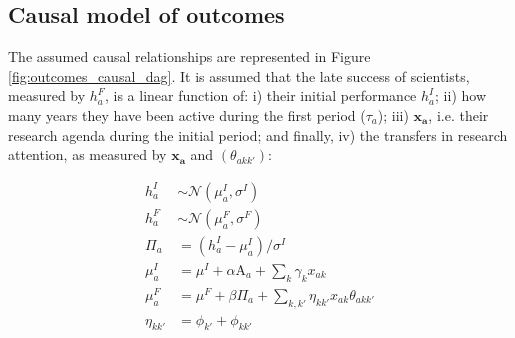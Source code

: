 \documentclass{article}
\begin{document}
\subsection{\label{appendix:outcomes}Causal model of outcomes}

The assumed causal relationships are represented in Figure \ref{fig:outcomes_causal_dag}. It is assumed that the late success of scientists, measured by $h_a^{F}$, is a linear function of: i) their initial performance $h_a^{I}$; ii) how many years they have been active during the first period ($\tau_a$); iii) $\bm{x_a}$, i.e. their research agenda during the initial period; and finally, iv) the transfers in research attention, as measured by $\bm{x_a}$ and $(\theta_{akk'})$:

\begin{align}
    h_a^{I} &\sim \mathcal{N}(\mu_{a}^I,\sigma^I)\\
    h_a^{F} &\sim \mathcal{N}(\mu_{a}^F ,\sigma^F)\\
    \Pi_a &= (h_a^{I}-\mu_{a}^I)/\sigma^I \\
    \mu_{a}^I &= \mu^I + \alpha \text{A}_a + \sum_{k}\gamma_k x_{ak}\\
    \mu_{a}^F &= \mu^F  + \beta \Pi_a +\sum_{k,k'}\eta_{kk'}x_{ak}\theta_{akk'}\\
    \eta_{kk'} &= \phi_{k'}+\phi_{kk'}
\end{align}
\end{document}
